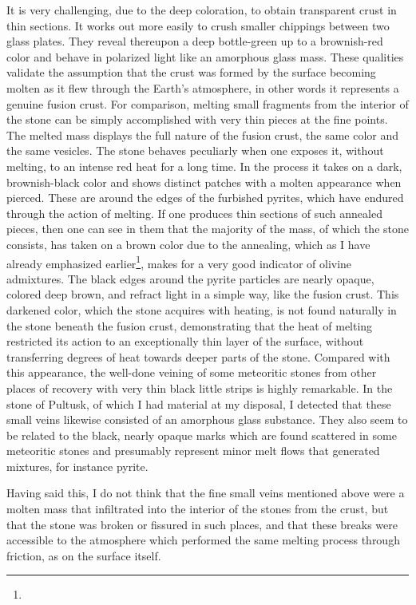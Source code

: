 \documentclass[a4paper, 12pt, oneside]{article}
\begin{document}
It is very challenging, due to the deep coloration, to obtain transparent crust in thin sections. It works out more easily to crush smaller chippings between two glass plates. They reveal thereupon a deep bottle-green up to a brownish-red color and behave in polarized light like an amorphous glass mass. These qualities validate the assumption that the crust was formed by the surface becoming molten as it flew through the Earth's atmosphere, in other words it represents a genuine fusion crust. For comparison, melting small fragments from the interior of the stone can be simply accomplished with very thin pieces at the fine points. The melted mass displays the full nature of the fusion crust, the same color and the same vesicles. The stone behaves peculiarly when one exposes it, without melting, to an intense red heat for a long time. In the process it takes on a dark, brownish-black color and shows distinct patches with a molten appearance when pierced. These are around the edges of the furbished pyrites, which have endured through the action of melting. If one produces thin sections of such annealed pieces, then one can see in them that the majority of the mass, of which the stone consists, has taken on a brown color due to the annealing, which as I have already emphasized earlier\footnote{}, makes for a very good indicator of olivine admixtures. The black edges around the pyrite particles are nearly opaque, colored deep brown, and refract light in a simple way, like the fusion crust. This darkened color, which the stone acquires with heating, is not found naturally in the stone beneath the fusion crust, demonstrating that the heat of melting restricted its action to an exceptionally thin layer of the surface, without transferring degrees of heat towards deeper parts of the stone. Compared with this appearance, the well-done veining of some meteoritic stones from other places of recovery with very thin black little strips is highly remarkable. In the stone of Pultusk, of which I had material at my disposal, I detected that these small veins likewise consisted of an amorphous glass substance. They also seem to be related to the black, nearly opaque marks which are found scattered in some meteoritic stones and presumably represent minor melt flows that generated mixtures, for instance pyrite.

Having said this, I do not think that the fine small veins mentioned above were a molten mass that infiltrated into the interior of the stones from the crust, but that the stone was broken or fissured in such places, and that these breaks were accessible to the atmosphere which performed the same melting process through friction, as on the surface itself.
\clearpage
\end{document}
